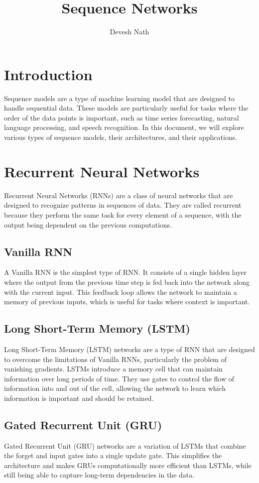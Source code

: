 \documentclass[12pt]{article}
\title{Sequence Networks}
\author{Devesh Nath}
\date{}
\begin{document}
\maketitle

\section{Introduction}
Sequence models are a type of machine learning model that are designed to handle sequential data. These models are particularly useful for tasks where the order of the data points is important, such as time series forecasting, natural language processing, and speech recognition. In this document, we will explore various types of sequence models, their architectures, and their applications.

\section{Recurrent Neural Networks}
Recurrent Neural Networks (RNNs) are a class of neural networks that are designed to recognize patterns in sequences of data. They are called recurrent because they perform the same task for every element of a sequence, with the output being dependent on the previous computations. 

\subsection{Vanilla RNN}
A Vanilla RNN is the simplest type of RNN. It consists of a single hidden layer where the output from the previous time step is fed back into the network along with the current input. This feedback loop allows the network to maintain a memory of previous inputs, which is useful for tasks where context is important.

\subsection{Long Short-Term Memory (LSTM)}
Long Short-Term Memory (LSTM) networks are a type of RNN that are designed to overcome the limitations of Vanilla RNNs, particularly the problem of vanishing gradients. LSTMs introduce a memory cell that can maintain information over long periods of time. They use gates to control the flow of information into and out of the cell, allowing the network to learn which information is important and should be retained.

\subsection{Gated Recurrent Unit (GRU)}
Gated Recurrent Unit (GRU) networks are a variation of LSTMs that combine the forget and input gates into a single update gate. This simplifies the architecture and makes GRUs computationally more efficient than LSTMs, while still being able to capture long-term dependencies in the data.
\end{document}
